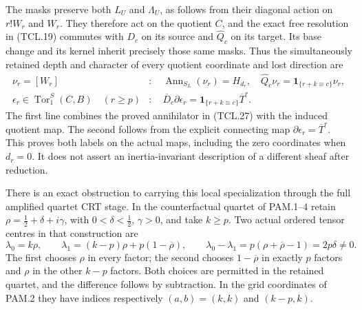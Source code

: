 The masks preserve both \(L_U\) and \(\Lambda_U\), as follows
from their diagonal action on \(r!W_r\) and \(W_r\). They
therefore act on the quotient \(C\), and the exact free resolution
in (TCL.19) commutes with \(D_c\) on its source and
\(\widehat Q_c\) on its target. Its base change and its kernel
inherit precisely those same masks. Thus the simultaneously retained
depth and character of every quotient coordinate and lost direction are
\[
 \begin{split}
 \nu_r=[W_r]&:\quad
       \operatorname{Ann}_{S_L}(\nu_r)=H_{d_r},\quad
       \widehat Q_c\nu_r=\mathbf 1_{\{r+k\equiv c\}}\nu_r,\\
 \epsilon_r\in\operatorname{Tor}_1^S(C,B)\quad(r\geq p)
     &:\quad \overline D_c\partial\epsilon_r
        =\mathbf 1_{\{r+k\equiv c\}}\overline T^r.
 \end{split}
 \tag{TCL.32}\label{eq:tcl-two-labels}
\]
The first line combines the proved annihilator in (TCL.27) with
the induced quotient map. The second follows from the explicit
connecting map \(\partial\epsilon_r=\overline T^r\).
This proves both labels on the actual maps, including the zero
coordinates when \(d_r=0\). It does not assert an inertia-invariant
description of a different sheaf after reduction.

There is an exact obstruction to carrying this local specialization
through the full amplified quartet CRT stage. In the counterfactual
quartet of PAM.1--4 retain
\(\rho=\tfrac12+\delta+i\gamma\), with
\(0<\delta<\tfrac12\), \(\gamma>0\), and take \(k\geq p\).
Two actual ordered tensor centres in that construction are
\[
 \lambda_0=k\rho,\qquad
 \lambda_1=(k-p)\rho+p(1-\overline\rho),\qquad
 \lambda_0-\lambda_1=p(\rho+\overline\rho-1)=2p\delta\ne0.
 \tag{TCL.33}\label{eq:tcl-crt-centres}
\]
The first chooses \(\rho\) in every factor; the second chooses
\(1-\overline\rho\) in exactly \(p\) factors and \(\rho\)
in the other \(k-p\) factors. Both choices are permitted in the
retained quartet, and the difference follows by subtraction.
In the grid coordinates of PAM.2 they have indices respectively
\((a,b)=(k,k)\) and \((k-p,k)\).


